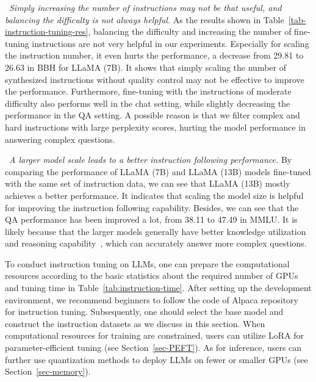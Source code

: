 \textbullet~{\emph{Simply increasing the number of instructions may not be that useful, and balancing the difficulty is not always helpful.}}
As the results shown in Table~\ref{tab-instruction-tuning-res}, balancing the difficulty and increasing the number of fine-tuning  instructions are not very helpful in our experiments. 
{Especially for scaling the instruction number, it even hurts the performance, \eg a decrease from 29.81 to 26.63 in BBH for LLaMA (7B).
It shows that simply scaling the number of synthesized instructions without quality control may not be effective  to improve the performance.}
Furthermore, fine-tuning with  the instructions of moderate difficulty also performs well in the chat setting, while slightly decreasing the performance in the QA setting.
A possible reason is that we filter complex and hard instructions with large perplexity scores, hurting the model performance in answering  complex questions.


\textbullet~{\emph{A larger model scale  leads to a better  instruction following performance.}} 
{By comparing the performance of LLaMA (7B) and LLaMA (13B) models fine-tuned with the same set of instruction data, we can see that LLaMA (13B) mostly achieves a better performance. 
It indicates that scaling the model size is helpful for improving the instruction following capability.
Besides, we can see that the QA performance has been improved a lot, \eg from 38.11 to 47.49 in MMLU.
It is likely  because  that the larger models generally have better knowledge utilization and reasoning capability~\cite{Wei-arxiv-2022-chain,Brown-NeurIPS-2020-Language}, which can  accurately answer more complex questions.
}

\begin{center}
\begin{tcolorbox}[colback=blue!5!white,colframe=blue!55!black,width=0.48\textwidth,title={Instruction Tuning Suggestions}]
{
To conduct instruction tuning on LLMs, one can prepare the computational resources according to the basic statistics about the required number of GPUs and tuning time in Table~\ref{tab:instruction-time}. 
After setting up the development environment,  we recommend beginners to follow the code of Alpaca repository~\cite{alpaca} for instruction tuning. %
Subsequently, one should select the base model and construct the instruction datasets as we discuss in this section.  
When computational resources for training are constrained, users can utilize LoRA for parameter-efficient tuning (see Section~\ref{sec-PEFT}). As for inference, users can further use quantization methods to deploy LLMs on fewer or smaller GPUs (see Section~\ref{sec-memory}).} 
\end{tcolorbox}
\end{center}
